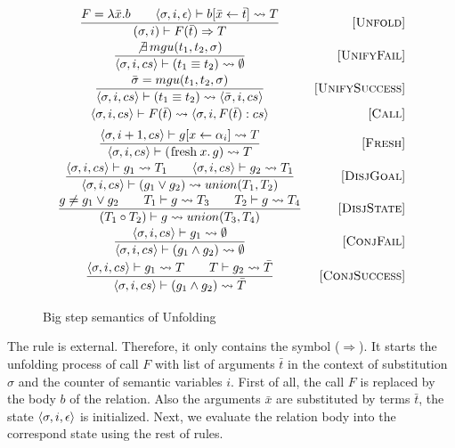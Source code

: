 \begin{figure}[h!]
\[\begin{array}{cr}

\dfrac{ F = \lambda \bar{x}. b \qquad \inbr{\sigma, i, \epsilon} \vdash b[\bar{x} \leftarrow \bar{t}] \leadsto T}
      {(\sigma, i) \vdash F(\bar{t}) \Rightarrow T}
&     \ruleno{Unfold} \\[3mm]
\dfrac{\not\exists \, mgu(t_1, t_2, \sigma)}
      {\inbr{\sigma, i, cs} \vdash (t_1 \equiv t_2) \leadsto \emptyset}
&     \ruleno{UnifyFail}  \\[3mm]
\dfrac{\bar\sigma = mgu(t_1, t_2, \sigma)}
      {\inbr{\sigma, i, cs} \vdash (t_1 \equiv t_2) \leadsto \inbr{\bar\sigma, i, cs}}
&     \ruleno{UnifySuccess}  \\[3mm]
      {\inbr{\sigma, i, cs} \vdash F(\bar{t}) \leadsto \inbr{ \sigma, i, F(\bar{t}) : cs}}
&     \ruleno{Call} \\[2mm]
\dfrac{\inbr{\sigma, i+1, cs} \vdash g[x \leftarrow \alpha_i] \leadsto T}
      {\inbr{\sigma, i, cs} \vdash (\mbox{\lstinline|fresh|} \, x. \, g) \leadsto T}
&     \ruleno{Fresh}  \\[3mm]
\dfrac{\inbr{\sigma, i, cs} \vdash g_1 \leadsto T_1 \qquad \inbr{\sigma, i, cs} \vdash g_2 \leadsto T_1}
      {\inbr{\sigma, i, cs} \vdash (g_1 \lor g_2) \leadsto union(T_1, T_2)}
&     \ruleno{DisjGoal}  \\[3mm]
\dfrac{g \not= g_1 \lor g_2 \qquad T_1 \vdash g \leadsto T_3 \qquad T_2 \vdash g \leadsto T_4}
      {(T_1 \circ T_2) \vdash g \leadsto union(T_3, T_4)}
&     \ruleno{DisjState}  \\[3mm]
\dfrac{\inbr{\sigma, i, cs} \vdash g_1 \leadsto \emptyset}
      {\inbr{\sigma, i, cs} \vdash (g_1 \land g_2) \leadsto \emptyset}
&     \ruleno{ConjFail}  \\[3mm]
\dfrac{\inbr{\sigma, i, cs} \vdash g_1 \leadsto T \qquad T \vdash g_2 \leadsto \bar{T}}
      {\inbr{\sigma, i, cs} \vdash (g_1 \land g_2) \leadsto \bar{T}}
&     \ruleno{ConjSuccess}  \\[3mm]
\end{array}\]

\caption{Big step semantics of Unfolding}
\label{fair:unfolding-semantics}
\end{figure}

The  rule is external. 
Therefore, it only contains the symbol ($\Rightarrow$). 
It starts the unfolding process of call $F$ with list of arguments $\bar{t}$ in the context of substitution $\sigma$ and the counter of semantic variables $i$.
First of all, the call $F$ is replaced by the body $b$ of the relation. Also the arguments $\bar{x}$ are substituted by terms $\bar{t}$, the state $\langle \sigma, i, \epsilon \rangle$ is initialized. Next, we evaluate the relation body into the correspond state using the rest of rules.

